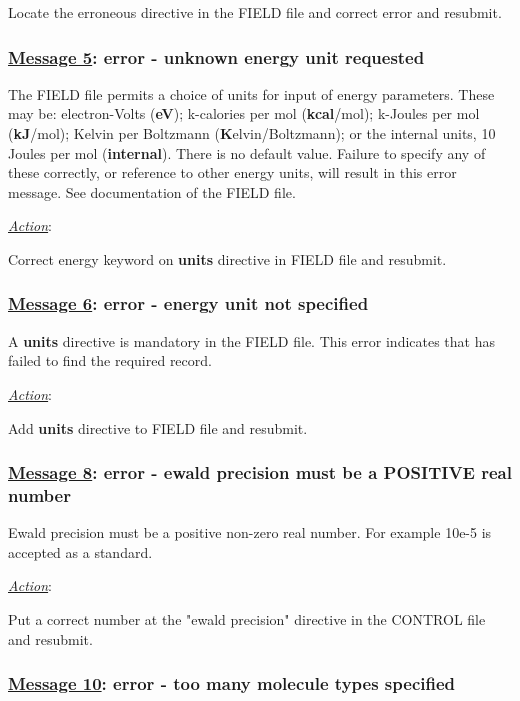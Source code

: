 Locate the erroneous directive in the FIELD file and correct error
and resubmit.

\subsubsection*{\underline{Message 5}: error - unknown energy unit requested}

The \D FIELD file permits a choice of units for input of energy
parameters.  These may be: electron-Volts ({\bf eV}); k-calories per mol
({\bf kcal}/mol); k-Joules per mol ({\bf kJ}/mol); Kelvin per Boltzmann
({\bf K}elvin/Boltzmann); or the \D internal units, 10 Joules per mol ({\bf internal}).
There is no default value.  Failure to specify any of these correctly, or reference
to other energy units, will result in this error message.  See
documentation of the FIELD file.

\noindent \underline{\em Action}:

Correct energy keyword on {\bf units} directive in FIELD file and
resubmit.

\subsubsection*{\underline{Message 6}: error - energy unit not specified}

A {\bf units} directive is mandatory in the FIELD file. This error
indicates that \D has failed to find the required record.

\noindent \underline{\em Action}:

Add {\bf units} directive to FIELD file and resubmit.

\subsubsection*{\underline{Message 8}: error - ewald precision must be a POSITIVE real number}

Ewald precision must be a positive non-zero real number.
For example 10e-5 is accepted as a standard.

\noindent \underline{\em Action}:

Put a correct number at the "ewald precision" directive in the CONTROL file and resubmit.

\subsubsection*{\underline{Message 10}: error - too many molecule types specified}

